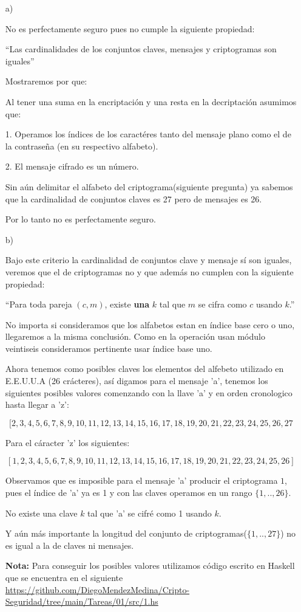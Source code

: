 \documentclass{article}
\begin{document}
\begin{enumerate}
\item[a)]

  No es perfectamente seguro pues no cumple la siguiente propiedad:

  ``Las cardinalidades de los conjuntos claves, mensajes y
  criptogramas son iguales''
  
  Mostraremos por que:
  
  Al tener una suma en la encriptación y una resta en la decriptación asumimos
  que:
  
  1. Operamos los índices de los caractéres tanto del mensaje plano como
  el de la contraseña (en su respectivo alfabeto).

  2. El mensaje cifrado es un número.

  Sin aún delimitar el alfabeto del criptograma(siguiente pregunta) ya sabemos
  que la cardinalidad de conjuntos claves es 27 pero de mensajes es 26.

  Por lo tanto no es perfectamente seguro.

\item[b)]
  
  Bajo este criterio la cardinalidad de conjuntos clave y mensaje sí son iguales,
  veremos que el de criptogramas no y que además no cumplen con la siguiente propiedad:

  ``Para toda pareja $(c, m)$, existe {\bf una} $k$ tal que $m$
  se cifra como $c$ usando $k$.''

  No importa si consideramos que los alfabetos estan en índice base cero o uno, llegaremos a
  la misma conclusión. Como en la operación usan módulo veintiseis consideramos
  pertinente usar índice base uno.

  Ahora tenemos como posibles claves los elementos del alfebeto utilizado en E.E.U.U.A
  (26 crácteres), así digamos para el mensaje 'a', tenemos los siguientes posibles valores
  comenzando con la llave 'a' y en orden cronologico hasta llegar a 'z':

  $$[2,3,4,5,6,7,8,9,10,11,12,13,14,15,16,17,18,19,20,21,22,23,24,25,26,27$$

  Para el cáracter 'z' los siguientes:

  $$[1,2,3,4,5,6,7,8,9,10,11,12,13,14,15,16,17,18,19,20,21,22,23,24,25,26]$$

  Observamos que es imposible para el mensaje 'a' producir el criptograma $1$, pues
  el índice de 'a' ya es 1 y con las claves operamos en un rango $\{1,..,26\}$.

  No existe una clave $k$ tal que 'a' se cifré como 1 usando $k$.

  Y aún más importante la longitud del conjunto de criptogramas($\{1,..,27\}$)
  no es igual a la de claves ni mensajes.

  {\bf *Nota:} Para conseguir los posibles valores utilizamos código escrito en
  Haskell que se encuentra en el siguiente
  \href{enlace}{https://github.com/DiegoMendezMedina/Cripto-Seguridad/tree/main/Tareas/01/src/1.hs}
\end{enumerate}
\end{document}
